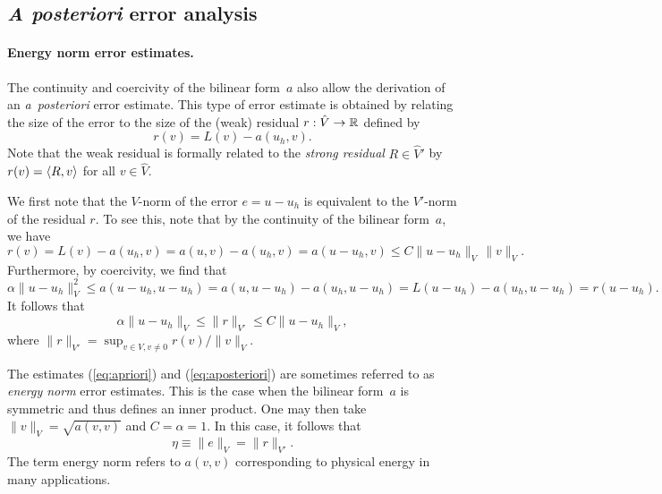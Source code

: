 \subsection{\emph{A posteriori} error analysis}

\paragraph{Energy norm error estimates.}

The continuity and coercivity of the bilinear form~$a$ also allow the
derivation of an \emph{a~posteriori} error estimate. This type of error
estimate is obtained by relating the size of the error to the size of
the (weak) residual $r : \hat{V} \rightarrow \mathbb{R}$ defined by
\begin{equation} \label{eq:residual,weak}
  r(v) = L(v) - a(u_h, v).
\end{equation}
Note that the weak residual is formally related to the \emph{strong
  residual} $R \in \hat{V}'$ by $r(v) = \langle R, v \rangle$ for all $v \in
\hat{V}$.

We first note that the $V$-norm of the error $e = u - u_h$ is
equivalent to the $V'$-norm of the residual $r$. To see this, note
that by the continuity of the bilinear form~$a$, we have
\begin{equation}
  r(v)
  = L(v) - a(u_h, v) = a(u, v) - a(u_h, v) = a(u - u_h, v)
  \leqslant C \|u - u_h\|_V \, \|v\|_V.
\end{equation}
Furthermore, by coercivity, we find that
\begin{equation}
  \alpha \|u - u_h\|^2_V
  \leqslant a(u - u_h, u - u_h)
  = a(u, u - u_h) - a(u_h, u - u_h)
  = L(u - u_h) - a(u_h, u - u_h) = r(u - u_h).
\end{equation}
It follows that
\begin{equation} \label{eq:aposteriori}
  \alpha \|u - u_h\|_V \leqslant \|r\|_{V'} \leqslant C \|u - u_h\|_V,
\end{equation}
where $\|r\|_{V'} = \sup_{v \in V, v \neq 0} r(v)/ \|v\|_V$.

The estimates (\ref{eq:apriori}) and (\ref{eq:aposteriori}) are
sometimes referred to as \emph{energy norm} error estimates. This is
the case when the bilinear form~$a$ is symmetric and thus defines an
inner product. One may then take $\|v\|_V = \sqrt{a(v, v)}$ and $C =
\alpha = 1$. In this case, it follows that
\begin{equation} \label{eq:aposteriori,energynorm}
  \eta \equiv \|e\|_V = \|r\|_{V'}.
\end{equation}
The term energy norm refers to $a(v, v)$ corresponding to physical
energy in many applications.


